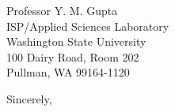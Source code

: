 \documentclass{letter} %
\begin{document}
\begin{letter}{
Professor Y. M. Gupta\\
ISP/Applied Sciences Laboratory\\
Washington State University\\
100 Dairy Road, Room 202\\
Pullman, WA 99164-1120\\
}
 
\closing{Sincerely,} 
 

 

\end{letter}
 
\end{document}
